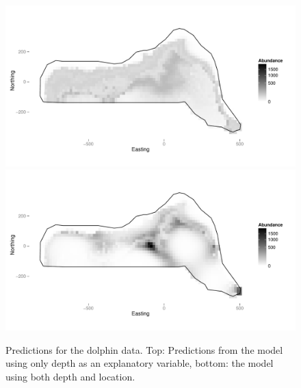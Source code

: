 \documentclass[a4paper,12pt]{article}
\begin{document}
\newpage

\begin{figure}[h!]
  \caption{Predictions for the dolphin data. Top: Predictions from the model using only depth as an explanatory variable, bottom: the model using both depth and location.}
  \label{fits-depth}
  \begin{center}
    \includegraphics[width=\textwidth]{figs/fit-depth}\\
    \includegraphics[width=\textwidth]{figs/fit-depth-xy}
  \end{center}
\end{figure}

\newpage
\end{document}
